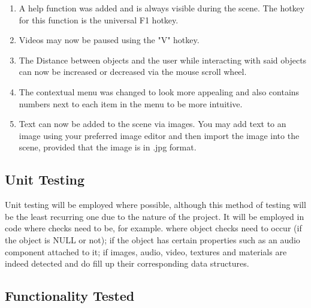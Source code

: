 \documentclass{article}
\begin{document}
	\begin{enumerate}
		\item A help function was added and is always visible during the scene. The hotkey for this function is the universal F1 hotkey.
		\item Videos may now be paused using the "V" hotkey.
		\item The Distance between objects and the user while interacting with said objects can now be increased or decreased via the mouse scroll wheel.
		\item The contextual menu was changed to look more appealing and also contains numbers next to each item in the menu to be more intuitive.
		\item Text can now be added to the scene via images. You may add text to an image using your preferred image editor and then import the image into the scene, provided that the image is in .jpg format. 
	\end{enumerate}

	\subsection{Unit Testing}

	Unit testing will be employed where possible, although this method of testing will be the least recurring one due to the nature of the project. It will be employed in code
	where checks need to be, for example. where object checks need to occur (if the object is NULL or not); if the object has certain properties such as an audio
	component attached to it; if images, audio, video, textures and materials are indeed detected and do fill up their corresponding data structures.

	\subsection{Functionality Tested}
\end{document}
